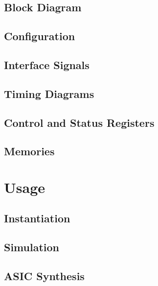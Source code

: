 \documentclass{ug}
\begin{document}
\subsection{Block Diagram}
\label{sec:bdd}


\ifdefined\CONFS
\subsection{Configuration}
\label{sec:ipconfig}

\fi

\subsection{Interface Signals}
\label{sec:ifsig}


\ifdefined\TD
\subsection{Timing Diagrams}
\label{sec:td}

\fi

\ifdefined\CSRS
\subsection{Control and Status Registers}
\label{sec:csrs}

\fi

\ifdefined\MEMS
\subsection{Memories}
\label{sec:mems}

\fi

\ifdefined\SECTIONCLEARPAGE
\clearpage
\fi
\section{Usage}

\subsection{Instantiation}
\label{sec:inst}


\subsection{Simulation}
\label{sec:tbbd}


\ifdefined\ASICSYNTH
\subsection{ASIC Synthesis}
\label{sec:synth}

\fi
\end{document}
